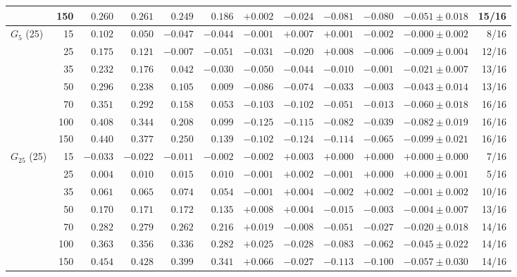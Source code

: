 \begin{tabular}{lrrrrrrrrrrr}
 & 150 & $0.260$ & $0.261$ & $0.249$ & $0.186$ & $+0.002$ & $-0.024$ & $-0.081$ & $-0.080$ & $-0.051 \pm 0.018$ & 15/16 \\
\midrule
$G_{5}$ (25) & 15 & $0.102$ & $0.050$ & $-0.047$ & $-0.044$ & $-0.001$ & $+0.007$ & $+0.001$ & $-0.002$ & $-0.000 \pm 0.002$ & 8/16 \\
 & 25 & $0.175$ & $0.121$ & $-0.007$ & $-0.051$ & $-0.031$ & $-0.020$ & $+0.008$ & $-0.006$ & $-0.009 \pm 0.004$ & 12/16 \\
 & 35 & $0.232$ & $0.176$ & $0.042$ & $-0.030$ & $-0.050$ & $-0.044$ & $-0.010$ & $-0.001$ & $-0.021 \pm 0.007$ & 13/16 \\
 & 50 & $0.296$ & $0.238$ & $0.105$ & $0.009$ & $-0.086$ & $-0.074$ & $-0.033$ & $-0.003$ & $-0.043 \pm 0.014$ & 13/16 \\
 & 70 & $0.351$ & $0.292$ & $0.158$ & $0.053$ & $-0.103$ & $-0.102$ & $-0.051$ & $-0.013$ & $-0.060 \pm 0.018$ & 16/16 \\
 & 100 & $0.408$ & $0.344$ & $0.208$ & $0.099$ & $-0.125$ & $-0.115$ & $-0.082$ & $-0.039$ & $-0.082 \pm 0.019$ & 16/16 \\
 & 150 & $0.440$ & $0.377$ & $0.250$ & $0.139$ & $-0.102$ & $-0.124$ & $-0.114$ & $-0.065$ & $-0.099 \pm 0.021$ & 16/16 \\
\midrule
$G_{25}$ (25) & 15 & $-0.033$ & $-0.022$ & $-0.011$ & $-0.002$ & $-0.002$ & $+0.003$ & $+0.000$ & $+0.000$ & $+0.000 \pm 0.000$ & 7/16 \\
 & 25 & $0.004$ & $0.010$ & $0.015$ & $0.010$ & $-0.001$ & $+0.002$ & $-0.001$ & $+0.000$ & $+0.000 \pm 0.001$ & 5/16 \\
 & 35 & $0.061$ & $0.065$ & $0.074$ & $0.054$ & $-0.001$ & $+0.004$ & $-0.002$ & $+0.002$ & $-0.001 \pm 0.002$ & 10/16 \\
 & 50 & $0.170$ & $0.171$ & $0.172$ & $0.135$ & $+0.008$ & $+0.004$ & $-0.015$ & $-0.003$ & $-0.004 \pm 0.007$ & 13/16 \\
 & 70 & $0.282$ & $0.279$ & $0.262$ & $0.216$ & $+0.019$ & $-0.008$ & $-0.051$ & $-0.027$ & $-0.020 \pm 0.018$ & 14/16 \\
 & 100 & $0.363$ & $0.356$ & $0.336$ & $0.282$ & $+0.025$ & $-0.028$ & $-0.083$ & $-0.062$ & $-0.045 \pm 0.022$ & 14/16 \\
 & 150 & $0.454$ & $0.428$ & $0.399$ & $0.341$ & $+0.066$ & $-0.027$ & $-0.113$ & $-0.100$ & $-0.057 \pm 0.030$ & 14/16 \\
\bottomrule
\end{tabular}
